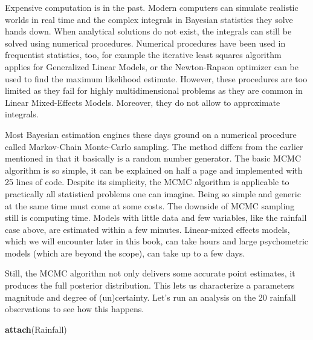 \documentclass[]{svmono}
\newenvironment{Shaded}{\begin{snugshade}}{\end{snugshade}}
\newcommand{\KeywordTok}[1]{\textcolor[rgb]{0.13,0.29,0.53}{\textbf{#1}}}
\newcommand{\DataTypeTok}[1]{\textcolor[rgb]{0.13,0.29,0.53}{#1}}
\newcommand{\DecValTok}[1]{\textcolor[rgb]{0.00,0.00,0.81}{#1}}
\newcommand{\StringTok}[1]{\textcolor[rgb]{0.31,0.60,0.02}{#1}}
\newcommand{\OperatorTok}[1]{\textcolor[rgb]{0.81,0.36,0.00}{\textbf{#1}}}
\newcommand{\NormalTok}[1]{#1}
\theoremstyle{definition}
\theoremstyle{definition}
\theoremstyle{definition}
\theoremstyle{remark}
\begin{document}
Expensive computation is in the past. Modern computers can simulate
realistic worlds in real time and the complex integrals in Bayesian
statistics they solve hands down. When analytical solutions do not
exist, the integrals can still be solved using numerical procedures.
Numerical procedures have been used in frequentist statistics, too, for
example the iterative least squares algorithm applies for Generalized
Linear Models, or the Newton-Rapson optimizer can be used to find the
maximum likelihood estimate. However, these procedures are too limited
as they fail for highly multidimensional problems as they are common in
Linear Mixed-Effects Models. Moreover, they do not allow to approximate
integrals.

Most Bayesian estimation engines these days ground on a numerical
procedure called Markov-Chain Monte-Carlo sampling. The method differs
from the earlier mentioned in that it basically is a random number
generator. The basic MCMC algorithm is so simple, it can be explained on
half a page and implemented with 25 lines of code. Despite its
simplicity, the MCMC algorithm is applicable to practically all
statistical problems one can imagine. Being so simple and generic at the
same time must come at some costs. The downside of MCMC sampling still
is computing time. Models with little data and few variables, like the
rainfall case above, are estimated within a few minutes. Linear-mixed
effects models, which we will encounter later in this book, can take
hours and large psychometric models (which are beyond the scope), can
take up to a few days.

Still, the MCMC algorithm not only delivers some accurate point
estimates, it produces the full posterior distribution. This lets us
characterize a parameters magnitude and degree of (un)certainty. Let's
run an analysis on the 20 rainfall observations to see how this happens.

\begin{Shaded}
\begin{Highlighting}[]
\KeywordTok{attach}\NormalTok{(Rainfall)}
\end{Highlighting}
\end{Shaded}

\begin{Shaded}
\end{Shaded}
\end{document}
